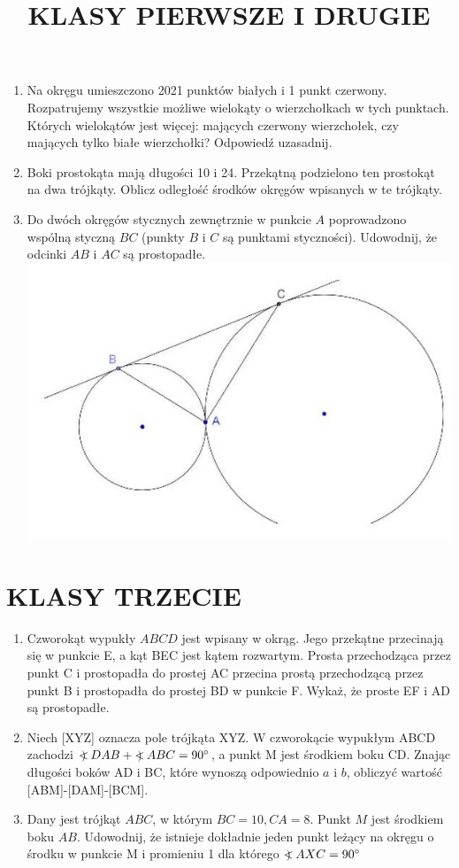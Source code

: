 \documentclass[10pt]{article}
\title{KLASY PIERWSZE I DRUGIE }
\author{}
\date{}
\newcommand\Varangle{\mathop{{<\!\!\!\!\!\text{\small)}}\:}\nolimits}
\begin{document}
\maketitle
\begin{enumerate}
  \item Na okręgu umieszczono 2021 punktów białych i 1 punkt czerwony. Rozpatrujemy wszystkie możliwe wielokąty o wierzchołkach w tych punktach. Których wielokątów jest więcej: mających czerwony wierzchołek, czy mających tylko białe wierzchołki? Odpowiedź uzasadnij.
  \item Boki prostokąta mają długości 10 i 24. Przekątną podzielono ten prostokąt na dwa trójkąty. Oblicz odległość środków okręgów wpisanych w te trójkąty.
  \item Do dwóch okręgów stycznych zewnętrznie w punkcie \(A\) poprowadzono wspólną styczną \(B C\) (punkty \(B\) i \(C\) są punktami styczności). Udowodnij, że odcinki \(A B\) i \(A C\) są prostopadłe.\\
\includegraphics[max width=\textwidth, center]{2024_11_21_4d4a36e74ff5475f5b63g-1}
\end{enumerate}

\section*{KLASY TRZECIE}
\begin{enumerate}
  \item Czworokąt wypukły \(A B C D\) jest wpisany w okrąg. Jego przekątne przecinają się w punkcie E, a kąt BEC jest kątem rozwartym. Prosta przechodząca przez punkt C i prostopadła do prostej AC przecina prostą przechodzącą przez punkt B i prostopadła do prostej BD w punkcie F. Wykaż, że proste EF i AD są prostopadłe.
  \item Niech [XYZ] oznacza pole trójkąta XYZ. W czworokącie wypukłym ABCD zachodzi \(\Varangle D A B+\Varangle A B C=90^{\circ}\), a punkt M jest środkiem boku CD. Znając długości boków AD i BC, które wynoszą odpowiednio \(a\) i \(b\), obliczyć wartość [ABM]-[DAM]-[BCM].
  \item Dany jest trójkąt \(A B C\), w którym \(B C=10, C A=8\). Punkt \(M\) jest środkiem boku \(A B\). Udowodnij, że istnieje dokładnie jeden punkt leżący na okręgu o środku w punkcie M i promieniu 1 dla którego \(\Varangle A X C=90^{\circ}\)
\end{enumerate}
\end{document}
